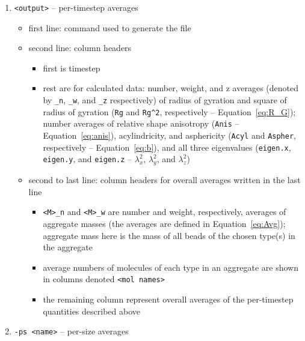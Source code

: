 \begin{enumerate}[nosep,leftmargin=20pt]
  \item \texttt{<output>} -- per-timestep averages
    \begin{itemize}[nosep,leftmargin=5pt]
      \item first line: command used to generate the file
      \item second line: column headers
        \begin{itemize}[nosep,leftmargin=10pt]
          \item first is timestep
          \item rest are for calculated data: number, weight, and z
            averages (denoted by \texttt{\_n}, \texttt{\_w}, and
            \texttt{\_z} respectively) of radius of gyration and square of
            radius of gyration (\texttt{Rg} and \texttt{Rg\^{}2},
            respectively -- Equation~\eqref{eq:R_G}); number averages of
            relative shape anisotropy (\texttt{Anis} --
            Equation~\eqref{eq:anis}), acylindricity, and asphericity
            (\texttt{Acyl} and \texttt{Aspher}, respectively --
            Equation~\eqref{eq:b}), and all three eigenvalues
            (\texttt{eigen.x}, \texttt{eigen.y}, and \texttt{eigen.z} --
            $\lambda_x^2$, $\lambda_y^2$, and $\lambda_z^2$)
        \end{itemize}
      \item second to last line: column headers for overall averages
        written in the last line
        \begin{itemize}[nosep,leftmargin=10pt]
          \item \texttt{<M>\_n} and \texttt{<M>\_w} are
            number and weight, respectively, averages of aggregate
            masses (the averages are defined in Equation~\eqref{eq:Avg});
            aggregate mass here is the mass of all beads of the chosen
            type(s) in the aggregate
          \item average numbers of molecules of each type in an aggregate
            are shown in columns denoted \texttt{<mol names>}
          \item the remaining column represent overall averages of the
            per-timestep quantities described above
        \end{itemize}
    \end{itemize}
  \item \texttt{-ps <name>} -- per-size averages
  \begin{itemize}[nosep,leftmargin=5pt]

\end{itemize}
\end{enumerate}
